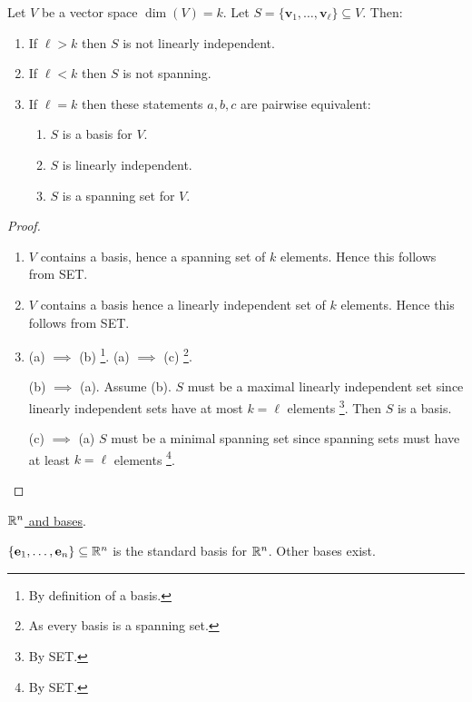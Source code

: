 \documentclass[10pt, a4paper]{article}
\newcommand{\mbf}[1]{\mathbf{#1}}
\begin{document}
\begin{theorem}
    Let $V$ be a vector space $\dim(V) = k$.
    Let $S = \{\mbf{v}_1, \dotsc, \mbf{v}_{\ell}\} \subseteq V$.
    Then:
    \begin{enumerate}[label = (\roman*)]
        \item If $\ell > k$ then $S$ is not linearly independent.
        \item If $\ell < k$ then $S$ is not spanning.
        \item If $\ell = k$ then these statements $a, b, c$ are pairwise equivalent:
        \begin{enumerate}[label = (\alph*)]
            \item $S$ is a basis for $V$.
            \item $S$ is linearly independent.
            \item $S$ is a spanning set for $V$.
        \end{enumerate}
    \end{enumerate}
    \begin{proof}
        \begin{enumerate}[label = (\roman*)]
            \item $V$ contains a basis,
            hence a spanning set of $k$ elements.
            Hence this follows from SET.
            \item $V$ contains a basis hence a linearly independent set of $k$ elements.
            Hence this follows from SET.
            \item (a) $\implies$ (b)
            \footnote{By definition of a basis.}.
            (a) $\implies$ (c)
            \footnote{As every basis is a spanning set.}.

            (b) $\implies$ (a).
            Assume (b).
            $S$ must be a maximal linearly independent set
            since linearly independent sets have at most $k = \ell$ elements
            \footnote{By SET.}.
            Then $S$ is a basis.

            (c) $\implies$ (a)
            $S$ must be a minimal spanning set since spanning sets must have at least $k = \ell$ elements
            \footnote{By SET.}.
        \end{enumerate}
    \end{proof}
\end{theorem}

\underline{$\mathbb{R} ^ n$ and bases}.

$\{\mbf{e}_1, \dotsc, \mbf{e}_n\} \subseteq \R ^ n$ is the standard basis for $\mathbb{R} ^ n$.
Other bases exist.
\end{document}
